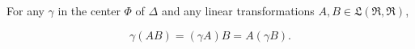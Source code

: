 For any $\gamma$ in the center $\Phi$ of $\Delta$ and any linear transformations $A, B \in \mathfrak{L}(\mathfrak{R}, \mathfrak{R})$,

$$\gamma(AB) = (\gamma A)B = A(\gamma B).$$
